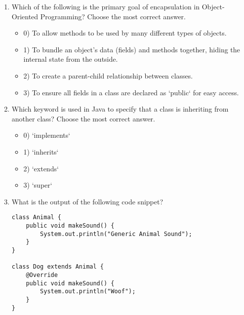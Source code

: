 \documentclass[12pt]{article}
\begin{document}
\begin{enumerate}[label=(\arabic*)]
\item Which of the following is the primary goal of encapsulation in Object-Oriented Programming?
Choose the most correct answer. 
\begin{itemize}
\item 0) To allow methods to be used by many different types of objects.
\item 1) To bundle an object's data (fields) and methods together, hiding the internal state from the outside.
\item 2) To create a parent-child relationship between classes.
\item 3) To ensure all fields in a class are declared as `public` for easy access.
\end{itemize}
\item Which keyword is used in Java to specify that a class is inheriting from another class?
Choose the most correct answer. 
\begin{itemize}
\item 0) `implements`
\item 1) `inherits`
\item 2) `extends`
\item 3) `super`
\end{itemize}
\item What is the output of the following code snippet?\n\begin{verbatim}
class Animal {
    public void makeSound() {
        System.out.println("Generic Animal Sound");
    }
}

class Dog extends Animal {
    @Override
    public void makeSound() {
        System.out.println("Woof");
    }
}


\end{verbatim}
\end{enumerate}
\end{document}
